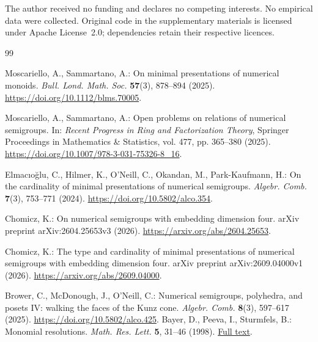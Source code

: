 \documentclass[11pt]{article}
\begin{document}
The author received no funding and declares no competing interests.
No empirical data were collected. Original code in the supplementary
materials is licensed under Apache License~2.0; dependencies retain
their respective licences.

\begin{thebibliography}{99}

 Moscariello, A., Sammartano, A.: On minimal presentations of numerical monoids. \emph{Bull. Lond. Math. Soc.} \textbf{57}(3), 878--894 (2025). \url{https://doi.org/10.1112/blms.70005}.

 Moscariello, A., Sammartano, A.: Open problems on relations of numerical semigroups. In: \emph{Recent Progress in Ring and Factorization Theory}, Springer Proceedings in Mathematics \& Statistics, vol. 477, pp. 365--380 (2025). \url{https://doi.org/10.1007/978-3-031-75326-8_16}.

 Elmac\i{}o\u{g}lu, C., Hilmer, K., O'Neill, C., Okandan, M., Park-Kaufmann, H.: On the cardinality of minimal presentations of numerical semigroups. \emph{Algebr. Comb.} \textbf{7}(3), 753--771 (2024). \url{https://doi.org/10.5802/alco.354}.

 Chomicz, K.: On numerical semigroups with embedding dimension four. arXiv preprint arXiv:2604.25653v3 (2026). \url{https://arxiv.org/abs/2604.25653}.

 Chomicz, K.: The type and cardinality of minimal presentations of numerical semigroups with embedding dimension four. arXiv preprint arXiv:2609.04000v1 (2026). \url{https://arxiv.org/abs/2609.04000}.

 Brower, C., McDonough, J., O'Neill, C.: Numerical semigroups, polyhedra, and posets IV: walking the faces of the Kunz cone. \emph{Algebr. Comb.} \textbf{8}(3), 597--617 (2025). \url{https://doi.org/10.5802/alco.425}.
Bayer, D., Peeva, I., Sturmfels, B.:
Monomial resolutions. \emph{Math. Res. Lett.} \textbf{5},
31--46 (1998).
\href{https://archive.intlpress.com/site/pub/files/_fulltext/journals/mrl/1998/0005/0001/MRL-1998-0005-0001-a003.pdf}{Full text}.

\end{thebibliography}
\end{document}
